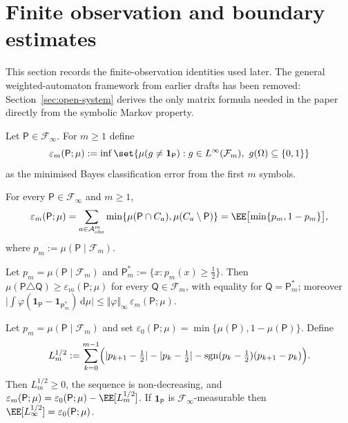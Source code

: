 \section{Finite observation and boundary estimates}\label{sec:clarity}

This section records the finite-observation identities used later.  The
general weighted-automaton framework from earlier drafts has been
removed: Section~\ref{sec:open-system} derives the only matrix formula
needed in the paper directly from the symbolic Markov property.

\begin{definition}\label{def:scan-error}
Let \(\mathsf{P}\in\mathcal{F}_\infty\).  For \(m\geq 1\) define
\[
  \varepsilon_m(\mathsf{P};\mu)
  := \inf\set{\mu(g\neq \mathbf{1}_{\mathsf{P}}):
      g\in L^{\infty}(\mathcal{F}_m),\ g(\Omega)\subseteq\{0,1\}}
\]
as the minimised Bayes classification error from the first \(m\) symbols.
\end{definition}

\begin{proposition}\label{prop:scan-error-cylinder}
For every \(\mathsf{P}\in\mathcal{F}_\infty\) and \(m\geq 1\),
\[
  \varepsilon_m(\mathsf{P};\mu)
  = \sum_{a\in\mathcal A_{\mathrm{obs}}^m}
      \min\{\mu(\mathsf{P}\cap C_a),\mu(C_a\setminus\mathsf{P})\}
  = \EE\bigl[\min\{p_m,1-p_m\}\bigr],
\]
where \(p_m:=\mu(\mathsf{P}\mid\mathcal{F}_m)\).
\end{proposition}

\begin{proposition}
\label{prop:bayes-optimality}
Let \(p_m=\mu(\mathsf{P}\mid\mathcal{F}_m)\) and
\(\mathsf{P}_m^*:=\{x:p_m(x)\geq \tfrac12\}\).  Then
\(\mu(\mathsf{P}\triangle \mathsf{Q})\geq \varepsilon_m(\mathsf{P};\mu)\)
for every \(\mathsf{Q}\in\mathcal{F}_m\), with equality for
\(\mathsf{Q}=\mathsf{P}_m^*\); moreover
\(\bigl|\int \varphi(\mathbf{1}_{\mathsf{P}}-
\mathbf{1}_{\mathsf{P}_m^*})\,\mathrm{d}\mu\bigr|
\leq \Vert\varphi\Vert_\infty\,\varepsilon_m(\mathsf{P};\mu)\).
\end{proposition}

\begin{theorem}\label{thm:tanaka-stokes}
Let \(p_m=\mu(\mathsf{P}\mid\mathcal{F}_m)\) and set
\(\varepsilon_0(\mathsf{P};\mu)=\min\{\mu(\mathsf{P}),1-\mu(\mathsf{P})\}\).
Define
\[
  L_m^{1/2}
  := \sum_{k=0}^{m-1}
      \Bigl(\lvert p_{k+1}-\tfrac12\rvert-\lvert p_k-\tfrac12\rvert
        - \operatorname{sgn}(p_k-\tfrac12)(p_{k+1}-p_k)\Bigr).
\]
Then \(L_m^{1/2}\geq 0\), the sequence is non-decreasing, and
\(\varepsilon_m(\mathsf{P};\mu)=\varepsilon_0(\mathsf{P};\mu)-
\EE[L_m^{1/2}]\).
If \(\mathbf{1}_{\mathsf{P}}\) is \(\mathcal{F}_\infty\)-measurable
then \(\EE[L_\infty^{1/2}]=\varepsilon_0(\mathsf{P};\mu)\).
\end{theorem}

